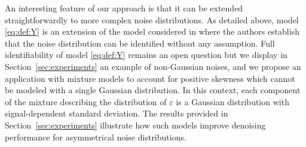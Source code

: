 \documentclass{article}
\begin{document}
An interesting  feature of our approach is that it can be extended straightforwardly to more complex noise distributions. As detailed above, model \eqref{eq:def:Y} is an extension of the model considered in \cite{gassiat:lecorff:lehericy:2021} where the authors establish that the noise distribution can be identified without any assumption. Full identifiability of model \eqref{eq:def:Y} remains an open question but we display in Section~\ref{sec:experiments} an example of non-Gaussian noises, and we propose an application with mixture models  to account for positive skewness which cannot be modeled with a single Gaussian distribution. In this context, each component of the mixture describing the distribution of $\varepsilon$ is a Gaussian distribution with signal-dependent standard deviation. The results provided in Section~\ref{sec:experiments} illustrate how such models improve denoising performance for asymmetrical noise distributions.





\end{document}
